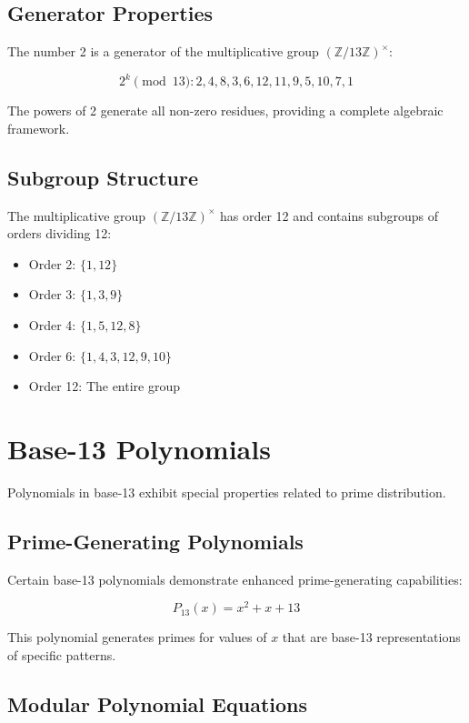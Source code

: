 \documentclass[12pt,a4paper]{report}
\begin{document}
\subsection{Generator Properties}

The number 2 is a generator of the multiplicative group $(\mathbb{Z}/13\mathbb{Z})^\times$:

\[
2^k \pmod{13}: 2, 4, 8, 3, 6, 12, 11, 9, 5, 10, 7, 1
\]

The powers of 2 generate all non-zero residues, providing a complete algebraic framework.

\subsection{Subgroup Structure}

The multiplicative group $(\mathbb{Z}/13\mathbb{Z})^\times$ has order 12 and contains subgroups of orders dividing 12:

\begin{itemize}
\item Order 2: $\{1, 12\}$
\item Order 3: $\{1, 3, 9\}$
\item Order 4: $\{1, 5, 12, 8\}$
\item Order 6: $\{1, 4, 3, 12, 9, 10\}$
\item Order 12: The entire group
\end{itemize}

\section{Base-13 Polynomials}

Polynomials in base-13 exhibit special properties related to prime distribution.

\subsection{Prime-Generating Polynomials}

Certain base-13 polynomials demonstrate enhanced prime-generating capabilities:

\[
P_{13}(x) = x^2 + x + 13
\]

This polynomial generates primes for values of $x$ that are base-13 representations of specific patterns.

\subsection{Modular Polynomial Equations}
\end{document}
